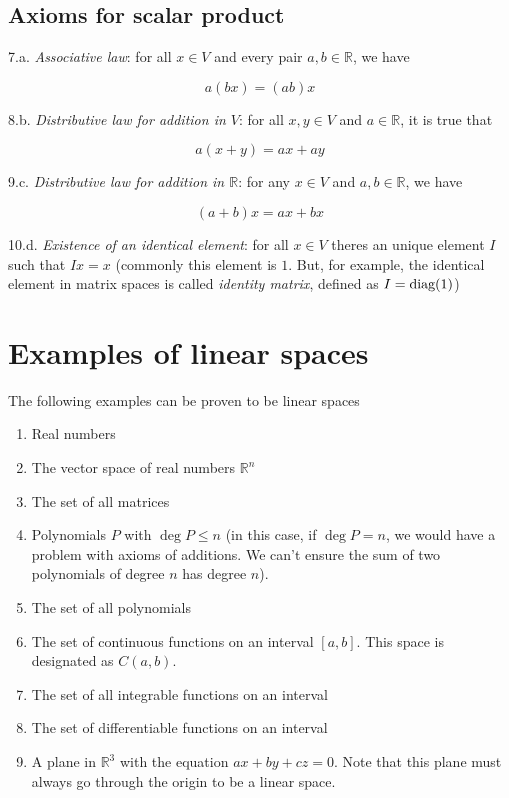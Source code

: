 \documentclass{book}
\begin{document}
\subsection*{Axioms for scalar product}
\begin{list}{Axiom}{}

    \item 7.a.\textit{ Associative law}: for all $x \in V$ and every pair $a,b\in \mathbb R$, we have

          \[
              a(bx) = (ab)x
          \]

    \item 8.b.\textit{ Distributive law for addition in $V$}: for all $x,y\in V$ and $a\in \mathbb{R}$, it is true that

          \[
              a(x+y) = ax+ay
          \]

    \item 9.c.\textit{ Distributive law for addition in $\mathbb R$}: for any $x\in V$ and $a,b\in\mathbb{R}$, we have

          \[
              (a+b)x = ax+bx
          \]

    \item 10.d.\textit{ Existence of an identical element}: for all $x\in V$ theres an unique element $I$ such that $Ix=x$
          (commonly this element is $1$. But, for example, the identical element in matrix spaces is called \textit{identity matrix},
          defined as $I=\textnormal{diag}(1)$)
\end{list}

\section{Examples of linear spaces}

The following examples can be proven to be linear spaces

\begin{enumerate}
    \item Real numbers
    \item The vector space of real numbers $\mathbb R^n$
    \item The set of all matrices
    \item Polynomials $P$ with $\deg P \leq n$ (in this case, if $\deg P = n$, we would
          have a problem with axioms of additions. We can't ensure the sum of two
          polynomials of degree $n$ has degree $n$).
    \item The set of all polynomials
    \item The set of continuous functions on an interval $\left[a, b\right]$. This space
          is designated as $C(a,b)$.
    \item The set of all integrable functions on an interval
    \item The set of differentiable functions on an interval
    \item A plane in $\mathbb R^3$ with the equation $ax+by+cz=0$. Note that this plane
          must always go through the origin to be a linear space.
\end{enumerate}
\end{document}

